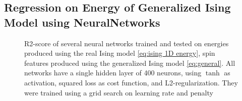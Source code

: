 \subsection{ Regression on Energy of Generalized Ising Model using NeuralNetworks}\label{sec:results NN reg}

\begin{figure}[H]
\centering
{}
\qquad
{}
\caption{R2-score of several neural networks trained and tested on energies produced using the real Ising model \autoref{eq:ising 1D energy}, spin features produced using the generalized Ising model \autoref{eq:general}. All networks have a single hidden layer of 400 neurons, using $\tanh$ as activation, squared loss as cost function, and L2-regularization. They were trained using a grid search on learning rate and penalty}
\label{fig:NN_reg}
\end{figure}


